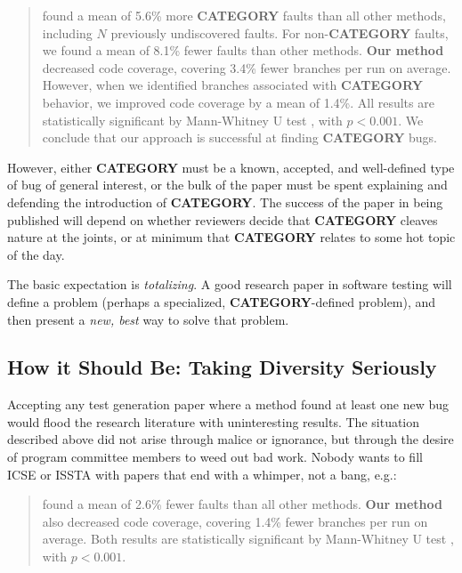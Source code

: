 \documentclass[sigplan,review]{acmart}
\begin{document}
\begin{quote}
 found a mean of 5.6\% more {\bf CATEGORY} faults than all
other methods, including $N$ previously undiscovered faults.  For
non-{\bf CATEGORY} faults, we found a mean of 8.1\% fewer faults than
other methods. {\bf Our
  method} decreased code coverage, covering 3.4\% fewer branches
per run on average.  However, when we identified branches associated
with {\bf CATEGORY} behavior, we improved code coverage by a mean of
1.4\%.  All results are statistically significant by
Mann-Whitney U test \cite{arcuri2014hitchhiker}, with $p < 0.001$.  We
conclude that our approach is successful at finding {\bf CATEGORY} bugs.
\end{quote}

However, either {\bf CATEGORY} must be a known, accepted, and
well-defined type of bug of general interest, or the bulk of the paper
must be spent explaining and defending the introduction of {\bf
  CATEGORY}.  The success of the paper in being published will depend
on whether reviewers decide that {\bf CATEGORY} cleaves nature at the
joints, or at minimum that {\bf CATEGORY} relates to some hot topic of
the day.

The basic expectation is \emph{totalizing}.  A good research paper in
software testing will define a problem (perhaps a specialized, {\bf
  CATEGORY}-defined problem), and then present a \emph{new, best} way
to solve that problem.

\subsection{How it Should Be: Taking Diversity Seriously}

Accepting any test generation paper where a method found at least one
new bug would flood the research literature with uninteresting
results.  The situation described above did not arise through malice
or ignorance, but through the desire of program committee members to
weed out bad work.  Nobody wants to fill ICSE or ISSTA with papers
that end with a whimper, not a bang, e.g.:

\begin{quote}
 found a mean of 2.6\% fewer faults than all
other methods.  {\bf Our
  method} also decreased code coverage, covering 1.4\% fewer branches
per run on average.  Both results are statistically significant by
Mann-Whitney U test \cite{arcuri2014hitchhiker}, with $p < 0.001$.
\end{quote}
\end{document}
